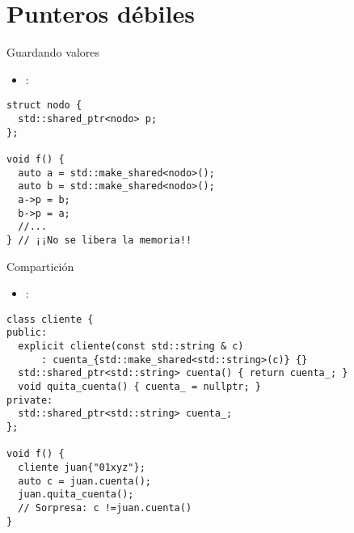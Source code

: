 \section{Punteros débiles}

\begin{frame}[t,fragile]{Guardando valores}
\begin{itemize}
  \item {}:
\end{itemize}
\begin{lstlisting}
struct nodo {
  std::shared_ptr<nodo> p;
};

void f() {
  auto a = std::make_shared<nodo>();
  auto b = std::make_shared<nodo>();
  a->p = b;
  b->p = a;
  //...
} // ¡¡No se libera la memoria!!
\end{lstlisting}
\end{frame}

\begin{frame}[t,fragile]{Compartición}
\begin{itemize}
  \item {}:
\end{itemize}
\begin{lstlisting}
class cliente {
public:
  explicit cliente(const std::string & c) 
      : cuenta_{std::make_shared<std::string>(c)} {}
  std::shared_ptr<std::string> cuenta() { return cuenta_; }
  void quita_cuenta() { cuenta_ = nullptr; }
private:
  std::shared_ptr<std::string> cuenta_;
};

void f() {
  cliente juan{"01xyz"};
  auto c = juan.cuenta();
  juan.quita_cuenta();
  // Sorpresa: c !=juan.cuenta()
}
\end{lstlisting}
\end{frame}

